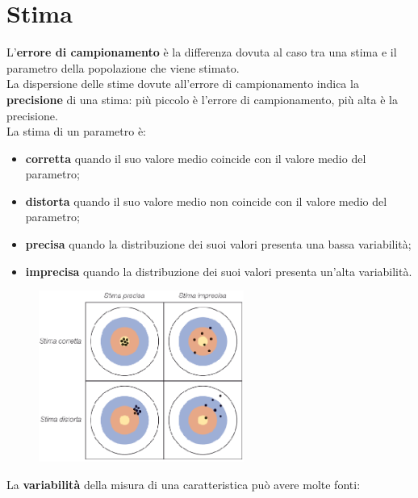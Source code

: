 \documentclass[10pt, draft]{book}
\newcommand{\tightlist}{%
\setlength{\itemsep}{1pt}\setlength{\parskip}{0pt}\setlength{\parsep}{0pt}}
\begin{document}
\section{Stima}
L'\textbf{errore di campionamento} è la differenza dovuta al caso tra una stima e il parametro della popolazione che viene stimato.
\\
La dispersione delle stime dovute all'errore di campionamento indica la \textbf{precisione} di una stima: più piccolo è l'errore di campionamento, più alta è la precisione.
\\
La stima di un parametro è:
\begin{itemize} \tightlist
    \item \textbf{corretta} quando il suo valore medio coincide con il valore medio del parametro;
    \item \textbf{distorta} quando il suo valore medio non coincide con il valore medio del parametro;
    \item \textbf{precisa} quando la distribuzione dei suoi valori presenta una bassa variabilità;
    \item \textbf{imprecisa} quando la distribuzione dei suoi valori presenta un'alta variabilità.
\end{itemize}
    \begin{figure}[H]\label{fig1.2-2}
    \centering
    \includegraphics[width=0.6\textwidth]{fig1.2-2}
    \caption{\small{}}
    \end{figure}
La \textbf{variabilità} della misura di una caratteristica può avere molte fonti:
\end{document}
